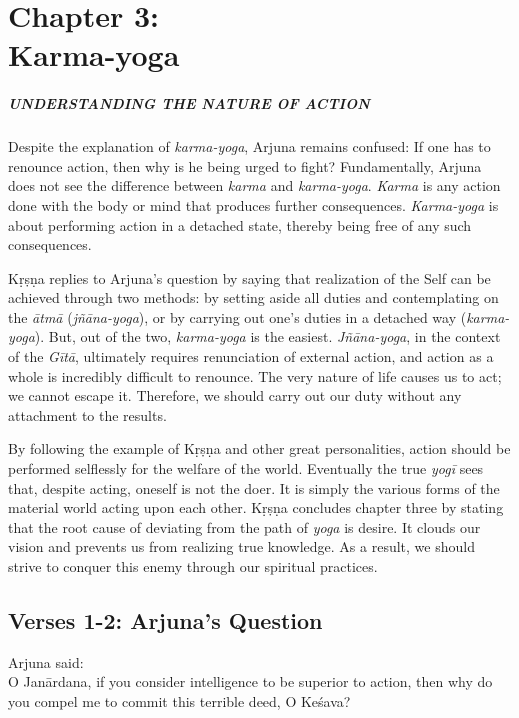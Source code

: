 \chapter{Chapter 3: \\Karma-yoga}\label{chap-karma-yoga}

\paragraph*{\MakeUppercase{Understanding the Nature of Action}}

\noindent Despite the explanation of \textit{karma-yoga}, Arjuna remains confused: If one has to renounce action, then why is he being urged to fight? Fundamentally, Arjuna does not see the difference between \textit{karma} and \textit{karma-yoga}. \textit{Karma} is any action done with the body or mind that produces further consequences. \textit{Karma-yoga} is about performing action in a detached state, thereby being free of any such consequences.

Kṛṣṇa replies to Arjuna’s question by saying that realization of the Self can be achieved through two methods: by setting aside all duties and contemplating on the \textit{ātmā} (\textit{jñāna-yoga}), or by carrying out one’s duties in a detached way (\textit{karma-yoga}). But, out of the two, \textit{karma-yoga} is the easiest. \textit{Jñāna-yoga}, in the context of the \textit{Gītā}, ultimately requires renunciation of external action, and action as a whole is incredibly difficult to renounce. The very nature of life causes us to act; we cannot escape it. Therefore, we should carry out our duty without any attachment to the results.

By following the example of Kṛṣṇa and other great personalities, action should be performed selflessly for the welfare of the world. Eventually the true \textit{yogī} sees that, despite acting, oneself is not the doer. It is simply the various forms of the material world acting upon each other. Kṛṣṇa concludes chapter three by stating that the root cause of deviating from the path of \textit{yoga} is desire. It clouds our vision and prevents us from realizing true knowledge. As a result, we should strive to conquer this enemy through our spiritual practices.

\section{Verses 1-2: Arjuna's Question}\label{sec-verses-1-2-arjuna-s-question}
{\hspace*{1em}Arjuna said: \\
O Janārdana, if you consider intelligence to be superior to action, then why do you compel me to commit this terrible deed, O Keśava?}

